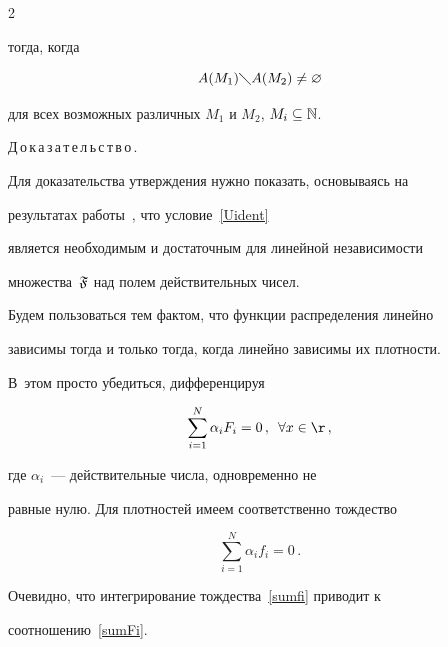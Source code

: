 \begin{multicols}{2}
{тогда, когда

\begin{equation}

\label{Uident} A(M_1)\diagdown A(M_2)\neq\varnothing

\end{equation}

для всех возможных различных $M_1$ и $M_2$, $M_i\subseteq\mathbb N$.}







\noindent

Д\,о\,к\,а\,з\,а\,т\,е\,л\,ь\,с\,т\,в\,о\,.\ \ 

Для доказательства утверж\-де\-ния нужно показать, основываясь на

результатах работы~\cite{Yakowitz1968}, что условие~\eqref{Uident}

является необходимым и достаточным для линейной независимости

множества~$\mathfrak F$ над полем действительных чисел.



Будем пользоваться тем фактом, что функции распределения линейно

зависимы тогда и только тогда, когда линейно зависимы их плотности. 

В~этом просто убедиться, дифференцируя

\begin{equation}

\label{sumFi}

\sum\limits_{i=1}^N \alpha_iF_i=0\,,\enskip\forall x\in\r\,,

\end{equation}

где $\alpha_i$~--- действительные числа, одновременно не

равные нулю. Для плотностей имеем соответственно тождество



\begin{equation}

\label{sumfi}

\sum\limits_{i=1}^N \alpha_if_i=0\,.

\end{equation}

Очевидно, что интегрирование тождества~\eqref{sumfi} приводит к

соотношению~\eqref{sumFi}.




\end{multicols}
